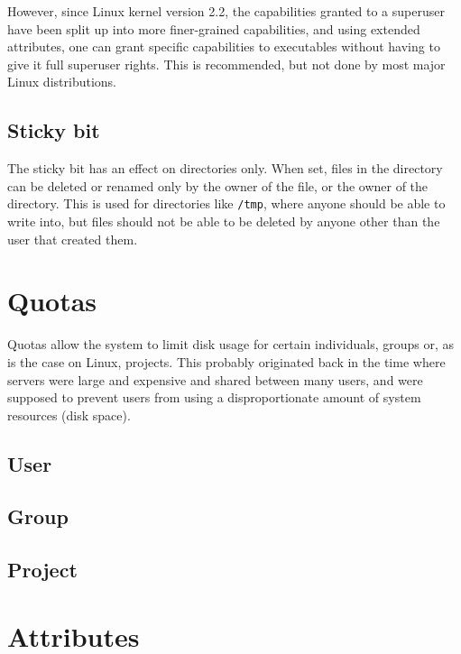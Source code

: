 \documentclass[a4paper]{article}
\begin{document}
However, since Linux kernel version 2.2, the capabilities granted to a superuser have been split up into more finer-grained capabilities, and using extended attributes, one can grant specific capabilities to executables without having to give it full superuser rights. This is recommended, but not done by most major Linux distributions.

\subsection{Sticky bit}

The sticky bit has an effect on directories only. When set, files in the directory can be deleted or renamed only by the owner of the file, or the owner of the directory. This is used for directories like \verb|/tmp|, where anyone should be able to write into, but files should not be able to be deleted by anyone other than the user that created them.

\section{Quotas}

Quotas allow the system to limit disk usage for certain individuals, groups or, as is the case on Linux, projects. This probably originated back in the time where servers were large and expensive and shared between many users, and were supposed to prevent users from using a disproportionate amount of system resources (disk space).

\subsection{User}

\subsection{Group}

\subsection{Project}


\section{Attributes}
\end{document}
